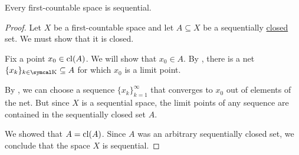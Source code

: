 \begin{proposition}\label{thm:first_countable_spaces_are_sequential}
  Every first-countable space is sequential.
\end{proposition}
\begin{proof}
  Let \( X \) be a first-countable space and let \( A \subseteq X \) be a sequentially \hyperref[def:sequential_closure_operator]{closed} set. We must show that it is closed.

  Fix a point \( x_0 \in \operatorname{cl}(A) \). We will show that \( x_0 \in A \). By , there is a net \( \{ x_k \}_{k \in \CK} \subseteq A \) for which \( x_0 \) is a limit point.

  By , we can choose a sequence \( \{ x_k \}_{k=1}^\infty \) that converges to \( x_0 \) out of elements of the net. But since \( X \) is a sequential space, the limit points of any sequence are contained in the sequentially closed set \( A \).

  We showed that \( A = \operatorname{cl}(A) \). Since \( A \) was an arbitrary sequentially closed set, we conclude that the space \( X \) is sequential.
\end{proof}
